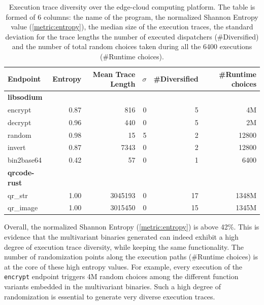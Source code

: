 {
\begin{table}
\small
\centering
\begin{tabular}{  p{1.9cm} |  r | r r | r r }

    Endpoint & Entropy & Mean Trace Length & $\sigma$ & \#Diversified & \#Runtime choices \\
    \hline
    \hline
    
    \textbf{libsodium}  \\
    \hline
    
encrypt & 0.87 & 816 & 0 & 5  & 4M\\

decrypt & 0.96  & 440 & 0 & 5 & 2M\\

random & 0.98 & 15 & 5 & 2 & 12800\\

invert & 0.87  & 7343 & 0 & 2 & 12800\\

bin2base64 & 0.42  & 57 & 0 & 1 & 6400\\

\hline
\textbf{qrcode-rust} \\
\hline
qr\_str & 1.00 & 3045193 & 0 & 17 & 1348M \\
qr\_image & 1.00  & 3015450 & 0 & 15 & 1345M\\
\hline

\end{tabular}
\caption{Execution trace diversity over the edge-cloud computing platform. The table is formed of 6 columns: the name of the program, the normalized Shannon Entropy value (\autoref{metric:entropy}), the median size of the execution traces, the standard deviation for the trace lengths the number of executed dispatchers (\#Diversified) and the number of total random choices taken during all the 6400 executions (\#Runtime choices).}\label{rq3:table:entropy}
\end{table}
}


Overall, the normalized Shannon Entropy (\autoref{metric:entropy}) is above 42\%. This is evidence that the multivariant binaries generated can indeed exhibit a high degree of execution trace diversity, while keeping the same functionality. The number of randomization points along the execution paths (\#Runtime choices) is at the core of these high entropy values. For example, every execution of the \texttt{encrypt} endpoint triggers 4M random choices among the different function variants embedded in the multivariant binaries. Such a high degree of randomization is essential to generate very diverse execution traces. 

